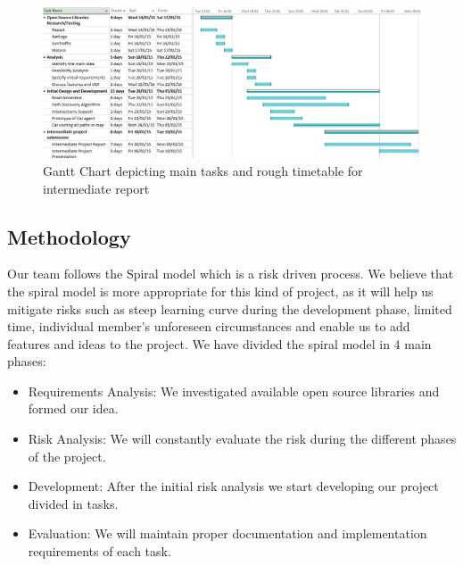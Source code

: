 \documentclass[oneside]{article}
\begin{document}
\begin{figure}[h]
\centering
\includegraphics[width=6in]{ganttchart}
\caption{Gantt Chart depicting main tasks and rough timetable for intermediate report}
\end{figure}

\subsection{Methodology}
 
Our team follows the Spiral model which is a risk driven process. We believe that the spiral model is more appropriate for this kind of project, as it will help us mitigate risks such as steep learning curve during the development phase, limited time, individual member's unforeseen circumstances and enable us to add features and ideas to the project. We have divided the spiral model in 4 main phases: 

 \begin{itemize}
 \setlength\itemsep{-0.5em}
  \item Requirements Analysis: We investigated available open source libraries and formed our idea. 
  \item Risk Analysis: We will constantly evaluate the risk during the different phases of the project. 
  \item  Development: After the initial risk analysis we start developing our project divided in tasks.
  \item  Evaluation: We will maintain proper documentation and implementation requirements of each task. 	  	  
 \end{itemize}
 
\end{document}
